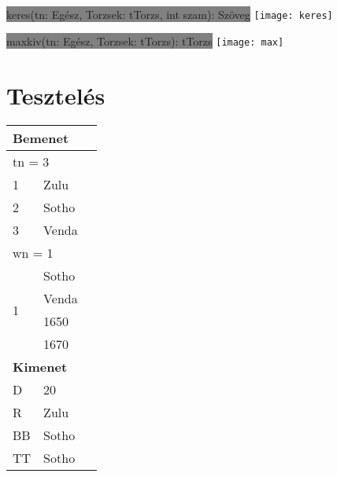 \documentclass[12pt]{report}
\begin{document}
\colorbox{Gray}{keres(tn: Egész, Torzsek: tTorzs, int szam): Szöveg}\newline
\texttt{[image: keres]}

\colorbox{Gray}{maxkiv(tn: Egész, Torzsek: tTorzs): tTorzs}\newline
\texttt{[image: max]}

\pagebreak
\section{Tesztelés}
\begin{Large}
\color{BlueB}{Érvényes teszteset}
\end{Large}
\vspace{5mm}

\begin{table}[h]
\begin{tabularx}{\textwidth}{|l| X |l|}
\hline
\multicolumn{2}{|l|}{\textbf{Bemenet}} \\ \hline
\multicolumn{2}{|l|}{tn = 3}           \\ \hline
1                        & Zulu        \\ \hline
2                        & Sotho       \\ \hline
3                        & Venda       \\ \hline
\multicolumn{2}{|l|}{wn = 1}           \\ \hline
\multirow{4}{*}{1}       & Sotho       \\ \cline{2-2} 
                         & Venda       \\ \cline{2-2} 
                         & 1650        \\ \cline{2-2} 
                         & 1670        \\ \hline
\multicolumn{2}{|l|}{\textbf{Kimenet}}          \\ \hline
D                        & 20          \\ \hline
R                        & Zulu        \\ \hline
BB                       & Sotho       \\ \hline
TT                       & Sotho       \\ \hline
\end{tabularx}
\end{table}
\begin{Large}
\color{BlueB}{Érvénytelen teszteset}
\end{Large}
\vspace{5mm}
\end{document}
